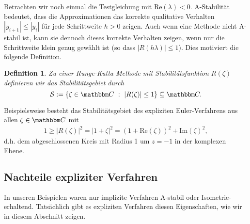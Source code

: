\documentclass[12pt,a4paper]{book}
\theoremstyle{break}
\newtheorem{definition}[theorem]{Definition}
\theoremstyle{nonumberplain}
\newcommand{\C}{\mathbbm C}
\renewcommand{\Re}{\mathrm{Re}}
\renewcommand{\Im}{\mathrm{Im}}
\newcommand{\1}{\mathbbm{1}} 			      	%
\begin{document}
Betrachten wir noch einmal die Testgleichung mit $\Re(\lambda)<0$. A-Stabilität bedeutet, dass die Approximationen das 
korrekte qualitative Verhalten 
$|y_{i+1}|\leq |y_i|$ für jede Schrittweite $h>0$ zeigen. Auch wenn eine Methode nicht A-stabil ist, kann sie dennoch dieses
korrekte Verhalten zeigen, wenn nur die Schrittweite klein genug gewählt ist (so dass $|R(h\lambda)|\leq 1$).
Dies motiviert die folgende Definition.

\begin{definition}
Zu einer Runge-Kutta Methode mit Stabilitätsfunktion $R(\zeta)$ definieren wir 
das \emph{Stabilitätsgebiet} durch 
\[
\mathcal S:=\left\{ \zeta\in \C\ : \ |R(\zeta)|\leq 1\right\}\subseteq \C.
\]
\end{definition}

Beispielsweise besteht das Stabilitätsgebiet des expliziten Euler-Verfahrens 
aus allen $\zeta\in \C$ mit
\begin{align*}
1\geq |R(\zeta)|^2=|1+\zeta|^2=(1+\Re(\zeta))^2+\Im(\zeta)^2,
\end{align*}
d.h. dem abgeschlossenen Kreis mit Radius 1 um $z=-1$ in der komplexen Ebene. 


\subsection{Nachteile expliziter Verfahren}\label{subsect:limit_expl}

In unseren Beispielen waren nur implizite Verfahren A-stabil oder Isometrie-erhaltend. Tatsächlich
gibt es expliziten Verfahren diesen Eigenschaften, wie wir in diesem Abschnitt zeigen.
\end{document}
